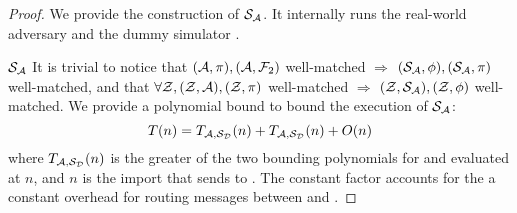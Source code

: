 \begin{proof}
We provide the construction of $\mathcal{S}_\mathcal{A}$.
It internally runs the real-world adversary \Adversary and the dummy simulator \Dummysim. 

$\mathcal{S}_\mathcal{A}$ 
It is trivial to notice that $(\mathcal{A}, \pi), (\mathcal{A}, \mathcal{F}_2)$ well-matched $\Rightarrow$ $(\mathcal{S}_\mathcal{A}, \phi), (\mathcal{S}_\mathcal{A}, \pi)$ well-matched, and that $\forall \mathcal{Z}, (\mathcal{Z}, \mathcal{A}), (\mathcal{Z}, \pi)$ well-matched $\Rightarrow$ $(\mathcal{Z}, \mathcal{S}_\mathcal{A}), (\mathcal{Z}, \phi)$ well-matched.
We provide a polynomial bound to bound the execution of $\mathcal{S}_\mathcal{A}$:
\[
T(n) = T_{\mathcal{A},\mathcal{S}_{\mathcal{D}}}(n) + T_{\mathcal{A},\mathcal{S}_{\mathcal{D}}}(n) + O(n)
\]
where $T_{\mathcal{A},\mathcal{S}_{\mathcal{D}}}(n)$ is the greater of the two bounding polynomials for \Dummysim and \Adversary evaluated at $n$, and $n$ is the import that \Environment sends to \Adversary. 
The constant factor accounts for the a constant overhead for routing messages between \Dummysim and \Adversary.




\end{proof}
